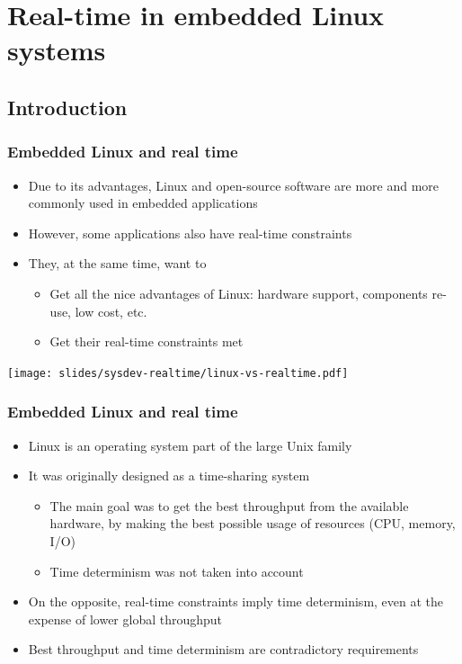 \section{Real-time in embedded Linux systems}

\subsection{Introduction}

\begin{frame}
  \frametitle{Embedded Linux and real time}
  \begin{itemize}
  \item Due to its advantages, Linux and open-source software are more
    and more commonly used in embedded applications
  \item However, some applications also have real-time constraints
  \item They, at the same time, want to
    \begin{itemize}
    \item Get all the nice advantages of Linux: hardware support,
      components re-use, low cost, etc.
    \item Get their real-time constraints met
    \end{itemize}
  \end{itemize}
  \begin{center}
    \texttt{[image: slides/sysdev-realtime/linux-vs-realtime.pdf]}
  \end{center}
\end{frame}

\begin{frame}
  \frametitle{Embedded Linux and real time}
  \begin{itemize}
  \item Linux is an operating system part of the large Unix family
  \item It was originally designed as a time-sharing system
    \begin{itemize}
    \item The main goal was to get the best throughput from the
      available hardware, by making the best possible usage of
      resources (CPU, memory, I/O)
    \item Time determinism was not taken into account
    \end{itemize}
  \item On the opposite, real-time constraints imply time determinism,
    even at the expense of lower global throughput
  \item Best throughput and time determinism are contradictory
    requirements
  \end{itemize}
\end{frame}

